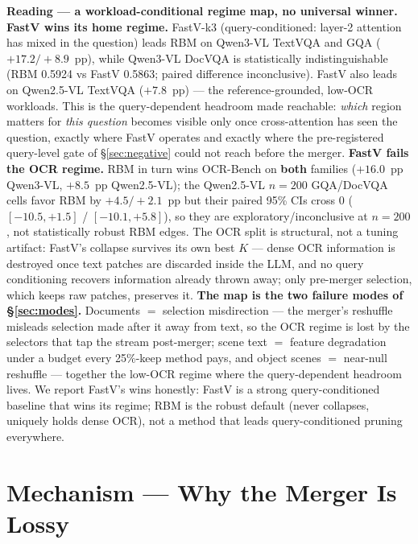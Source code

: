 \documentclass[sigconf,review,anonymous]{acmart}
\begin{document}
\textbf{Reading --- a workload-conditional regime map, no universal winner.}
\textbf{FastV wins its home regime.} FastV-k3 (query-conditioned: layer-2
attention has mixed in the question) leads RBM on Qwen3-VL TextVQA and GQA
($+17.2 / +8.9$~pp), while Qwen3-VL DocVQA is statistically indistinguishable
(RBM 0.5924 vs FastV 0.5863; paired difference inconclusive). FastV also leads
on Qwen2.5-VL TextVQA ($+7.8$~pp)
--- the reference-grounded, low-OCR workloads. This is the query-dependent
headroom made reachable: \emph{which} region matters for \emph{this question}
becomes visible only once cross-attention has seen the question, exactly where
FastV operates and exactly where the pre-registered query-level gate of
\S\ref{sec:negative} could not reach before the merger. \textbf{FastV fails the
OCR regime.} RBM in turn wins OCR-Bench on \textbf{both} families ($+16.0$~pp
Qwen3-VL, $+8.5$~pp Qwen2.5-VL); the Qwen2.5-VL $n = 200$ GQA/DocVQA cells
favor RBM by $+4.5 / +2.1$~pp but their paired 95\% CIs cross 0
($[-10.5, +1.5]$ / $[-10.1, +5.8]$), so they are exploratory/inconclusive at
$n = 200$, not statistically robust RBM edges. The OCR split is structural, not a tuning artifact:
FastV's collapse survives its own best $K$ --- dense OCR information is
destroyed once text patches are discarded inside the LLM, and no query
conditioning recovers information already thrown away; only pre-merger
selection, which keeps raw patches, preserves it. \textbf{The map is the two
failure modes of \S\ref{sec:modes}.} Documents $=$ selection misdirection ---
the merger's reshuffle misleads selection made after it away from text, so the
OCR regime is lost by the selectors that tap the stream post-merger; scene text
$=$ feature degradation under a budget every 25\%-keep method pays, and object
scenes $=$ near-null reshuffle --- together the low-OCR regime where the
query-dependent headroom lives. We report FastV's wins honestly: FastV is a
strong query-conditioned baseline that wins its regime; RBM is the robust
default (never collapses, uniquely holds dense OCR), not a method that leads
query-conditioned pruning everywhere.

\section{Mechanism --- Why the Merger Is Lossy}\label{sec:mechanism}
\end{document}
